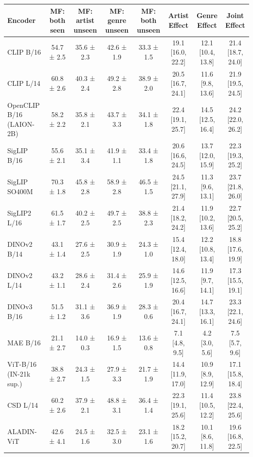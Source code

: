 \begin{tabular}{lccccccc}
\toprule
Encoder & MF: both seen & MF: artist unseen & MF: genre unseen & MF: both unseen & Artist Effect & Genre Effect & Joint Effect \\
\midrule
CLIP B/16 & 54.7 ± 2.5 & 35.6 ± 2.3 & 42.6 ± 1.9 & 33.3 ± 1.5 & 19.1 [16.0, 22.2] & 12.1 [10.4, 13.8] & 21.4 [18.7, 24.0] \\
CLIP L/14 & 60.8 ± 2.6 & 40.3 ± 2.4 & 49.2 ± 2.8 & 38.9 ± 2.0 & 20.5 [16.7, 24.1] & 11.6 [9.8, 13.6] & 21.9 [19.5, 24.5] \\
OpenCLIP B/16 (LAION-2B) & 58.2 ± 2.2 & 35.8 ± 2.1 & 43.7 ± 3.3 & 34.1 ± 1.8 & 22.4 [19.1, 25.7] & 14.5 [12.5, 16.4] & 24.2 [22.0, 26.2] \\
SigLIP B/16 & 55.6 ± 2.1 & 35.1 ± 3.4 & 41.9 ± 1.1 & 33.4 ± 1.8 & 20.6 [16.6, 24.5] & 13.7 [12.0, 15.9] & 22.3 [19.3, 25.2] \\
SigLIP SO400M & 70.3 ± 1.8 & 45.8 ± 2.8 & 58.9 ± 2.8 & 46.5 ± 1.5 & 24.5 [21.1, 27.9] & 11.3 [9.6, 13.1] & 23.7 [21.8, 26.0] \\
SigLIP2 L/16 & 61.5 ± 1.7 & 40.2 ± 2.5 & 49.7 ± 2.5 & 38.8 ± 2.3 & 21.4 [18.2, 24.2] & 11.9 [10.2, 13.6] & 22.7 [20.5, 25.2] \\
DINOv2 B/14 & 43.1 ± 1.4 & 27.6 ± 2.5 & 30.9 ± 1.9 & 24.3 ± 1.0 & 15.4 [12.4, 18.0] & 12.2 [10.8, 13.4] & 18.8 [17.6, 19.9] \\
DINOv2 L/14 & 43.2 ± 1.1 & 28.6 ± 2.4 & 31.4 ± 2.6 & 25.9 ± 1.9 & 14.6 [12.5, 16.6] & 11.9 [9.7, 14.1] & 17.3 [15.5, 19.1] \\
DINOv3 B/16 & 51.5 ± 1.2 & 31.1 ± 3.6 & 36.9 ± 1.9 & 28.3 ± 0.6 & 20.4 [16.7, 24.1] & 14.7 [13.3, 16.1] & 23.3 [22.1, 24.6] \\
MAE B/16 & 21.1 ± 2.7 & 14.0 ± 0.3 & 16.9 ± 1.5 & 13.6 ± 0.8 & 7.1 [4.8, 9.5] & 4.2 [3.0, 5.6] & 7.5 [5.7, 9.6] \\
ViT-B/16 (IN-21k sup.) & 38.8 ± 2.7 & 24.3 ± 1.5 & 27.9 ± 3.3 & 21.7 ± 1.9 & 14.4 [11.9, 17.0] & 10.9 [8.9, 12.9] & 17.1 [15.8, 18.4] \\
CSD L/14 & 60.2 ± 2.6 & 37.9 ± 2.1 & 48.8 ± 3.1 & 36.4 ± 1.4 & 22.3 [19.1, 25.6] & 11.4 [10.5, 12.2] & 23.8 [22.4, 25.6] \\
ALADIN-ViT & 42.6 ± 4.1 & 24.5 ± 1.6 & 32.5 ± 3.0 & 23.1 ± 1.6 & 18.2 [15.2, 20.7] & 10.1 [8.6, 11.8] & 19.6 [16.8, 22.5] \\
\bottomrule
\end{tabular}
